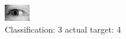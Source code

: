 \begin{figure}[h!]
\begin{center}
\includegraphics[width=0.60\columnwidth]{figures/ID3168_class_3_target_4.png}
\end{center}
\caption{ Classification: 3 actual target: 4}
\label{fig:ID3168_class_3_target_4}
\end{figure}
